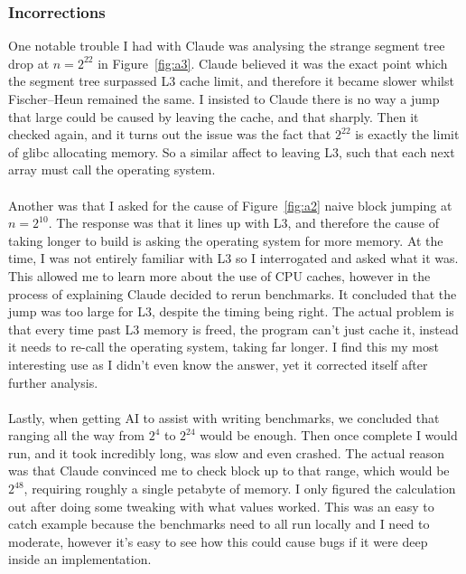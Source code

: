 \documentclass{article}
\theoremstyle{definition}
\begin{document}
\subsubsection{Incorrections}
One notable trouble I had with Claude was analysing the strange segment tree drop at $n = 2^{22}$ in Figure~\ref{fig:a3}.  Claude believed it was the exact point which the segment tree surpassed L3 cache limit, and therefore it became slower whilst Fischer--Heun remained the same.  I insisted to Claude there is no way a jump that large could be caused by leaving the cache, and that sharply.  Then it checked again, and it turns out the issue was the fact that $2^{22}$ is exactly the limit of glibc allocating memory.  So a similar affect to leaving L3, such that each next array must call the operating system.
\\
\\
Another was that I asked for the cause of Figure~\ref{fig:a2} naive block jumping at $n = 2^{10}$.  The response was that it lines up with L3, and therefore the cause of taking longer to build is asking the operating system for more memory.  At the time, I was not entirely familiar with L3 so I interrogated and asked what it was.  This allowed me to learn more about the use of CPU caches, however in the process of explaining Claude decided to rerun benchmarks.  It concluded that the jump was too large for L3, despite the timing being right.  The actual problem is that every time past L3 memory is freed, the program can't just cache it, instead it needs to re-call the operating system, taking far longer.  I find this my most interesting use as I didn't even know the answer, yet it corrected itself after further analysis.
\\
\\
Lastly, when getting AI to assist with writing benchmarks, we concluded that ranging all the way from $2^4$ to $2^{24}$ would be enough.  Then once complete I would run, and it took incredibly long, was slow and even crashed.  The actual reason was that Claude convinced me to check block up to that range, which would be $2^{48}$, requiring roughly a single petabyte of memory.  I only figured the calculation out after doing some tweaking with what values worked.  This was an easy to catch example because the benchmarks need to all run locally and I need to moderate, however it's easy to see how this could cause bugs if it were deep inside an implementation.
\end{document}
